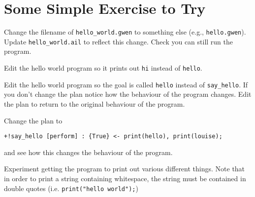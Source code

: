 \section{Some Simple Exercise to Try}
\begin{enumerate}
\begin{sloppypar}
\item Change the filename of \texttt{hello\_world.gwen} to something else (e.g., \texttt{hello.gwen}).  Update \texttt{hello\_world.ail} to reflect this change.  Check you can still run the program.
\item Edit the hello world program so it prints out \texttt{hi} instead of \texttt{hello}.
\item Edit the hello world program so the goal is called \texttt{hello} instead of \texttt{say\_hello}.  If you don't change the plan notice how the behaviour of the program changes.  Edit the plan to return to the original behaviour of the program.
\end{sloppypar}
\item Change the plan to
\begin{verbatim}
+!say_hello [perform] : {True} <- print(hello), print(louise);
\end{verbatim} and see how this changes the behaviour of the program.
\item Experiment getting the program to print out various different things.  Note that in order to print a string containing whitespace, the string must be contained in double quotes (i.e. \lstinline{print("hello world");})
\end{enumerate}

